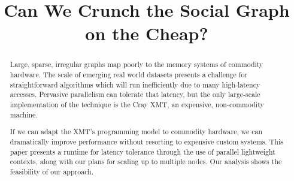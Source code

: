 \documentclass[10pt,nocopyrightspace,preprint]{sigplanconf}
\begin{document}
\renewcommand{\baselinestretch}{0.9}

\title{Can We Crunch the Social Graph on the Cheap?}



\maketitle

\begin{abstract}


  Large, sparse, irregular graphs map poorly to the memory systems of
  commodity hardware. The scale of emerging real world datasets
  presents a challenge for straightforward algorithms which will run
  inefficiently due to many high-latency accesses.  Pervasive
  parallelism can tolerate that latency, but the only large-scale
  implementation of the technique is the Cray XMT, an expensive,
  non-commodity machine.

  If we can adapt the XMT's programming model to commodity hardware,
  we can dramatically improve performance without resorting to
  expensive custom systems. This paper presents a runtime for latency
  tolerance through the use of parallel lightweight contexts, along
  with our plans for scaling up to multiple nodes. Our analysis shows
  the feasibility of our approach.
\end{abstract}
\end{document}
